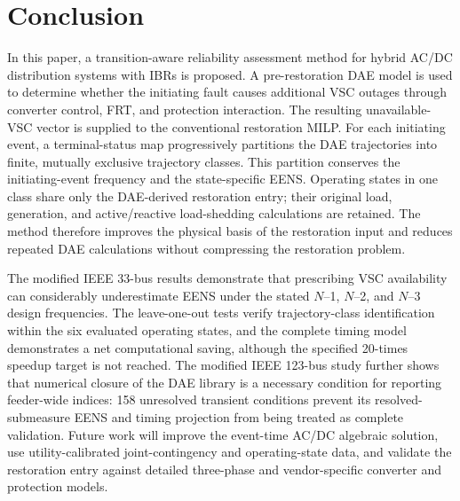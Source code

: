 \documentclass[journal]{IEEEtran}
\begin{document}




\section{Conclusion}
In this paper, a transition-aware reliability assessment method for hybrid
AC/DC distribution systems with IBRs is proposed. A pre-restoration DAE model
is used to determine whether the initiating fault causes additional VSC
outages through converter control, FRT, and protection interaction. The
resulting unavailable-VSC vector is supplied to the conventional restoration
MILP. For each initiating event, a terminal-status map progressively partitions
the DAE trajectories into finite, mutually exclusive trajectory classes. This
partition conserves the initiating-event frequency and the state-specific EENS.
Operating states in one class share only the DAE-derived restoration entry;
their original load, generation, and active/reactive load-shedding calculations
are retained. The method therefore improves the physical basis of the
restoration input and reduces repeated DAE calculations without compressing the
restoration problem.

The modified IEEE 33-bus results demonstrate that prescribing VSC availability
can considerably underestimate EENS under the stated $N$--1, $N$--2, and
$N$--3 design frequencies. The leave-one-out tests verify trajectory-class
identification within the six evaluated operating states, and the complete
timing model demonstrates a net computational saving, although the specified
20-times speedup target is not reached. The modified IEEE 123-bus study further
shows that numerical closure of the DAE library is a necessary condition for
reporting feeder-wide indices: 158 unresolved transient conditions prevent its
resolved-submeasure EENS and timing projection from being treated as complete
validation. Future work will improve the event-time AC/DC algebraic solution,
use utility-calibrated joint-contingency and operating-state data, and validate
the restoration entry against detailed three-phase and vendor-specific
converter and protection models.



\end{document}
